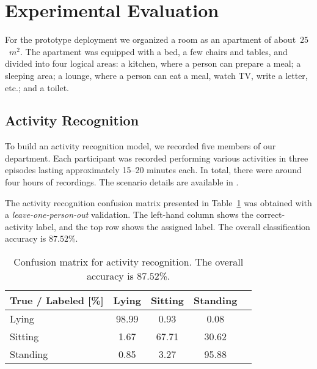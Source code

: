 \section{Experimental Evaluation}
\label{sec:experiments}

For the prototype deployment we organized a room as an apartment of about~$25$~$m^2$. The apartment was equipped with a bed, a few chairs and tables, and divided into four logical areas: a kitchen, where a person can prepare a meal; a sleeping area; a lounge, where a person can eat a meal, watch TV, write a letter, etc.; and a toilet.



\subsection{Activity Recognition}
\label{sec:experiments:activities}
To build an activity recognition model, we recorded five members of our department. Each participant was recorded performing various activities in three episodes lasting approximately 15--20 minutes each. In total, there were around four hours of recordings. The scenario details are available in \cite{Kaluza2010Agentbased}.

The activity recognition confusion matrix presented in Table~\ref{tab:actRecognition} was obtained with a {\it leave-one-person-out} validation. The left-hand column shows the correct-activity label, and the top row shows the assigned label. The overall classification accuracy is $87.52$\%.

\begin{table}[h!]
\centering
\caption{Confusion matrix for activity recognition. The overall accuracy is $87.52$\%.}
\begin{tabular}{lcccc}
\toprule
True / Labeled [\%] & Lying & Sitting & Standing  \\
\hline
Lying    & 98.99& 0.93& 0.08  \\
Sitting  & 1.67& 67.71& 30.62 \\
Standing & 0.85& 3.27& 95.88 \\
\toprule
\end{tabular}
\label{tab:actRecognition}
\end{table}




